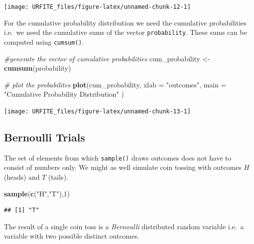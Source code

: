 \documentclass[]{book}
\newenvironment{Shaded}{\begin{snugshade}}{\end{snugshade}}
\newcommand{\KeywordTok}[1]{\textcolor[rgb]{0.13,0.29,0.53}{\textbf{#1}}}
\newcommand{\DataTypeTok}[1]{\textcolor[rgb]{0.13,0.29,0.53}{#1}}
\newcommand{\DecValTok}[1]{\textcolor[rgb]{0.00,0.00,0.81}{#1}}
\newcommand{\StringTok}[1]{\textcolor[rgb]{0.31,0.60,0.02}{#1}}
\newcommand{\CommentTok}[1]{\textcolor[rgb]{0.56,0.35,0.01}{\textit{#1}}}
\newcommand{\NormalTok}[1]{#1}
\theoremstyle{definition}
\theoremstyle{definition}
\theoremstyle{definition}
\theoremstyle{remark}
\begin{document}
\begin{center}\texttt{[image: URFITE\_files/figure-latex/unnamed-chunk-12-1]} \end{center}

For the cumulative probability distribution we need the cumulative
probabilities i.e.~we need the cumulative sums of the vector
\texttt{probability}. These sums can be computed using
\texttt{cumsum()}.

\begin{Shaded}
\begin{Highlighting}[]
\CommentTok{#generate the vector of cumulative probabilities }
\NormalTok{cum_probability <-}\StringTok{ }\KeywordTok{cumsum}\NormalTok{(probability) }

\CommentTok{# plot the probabilites }
\KeywordTok{plot}\NormalTok{(cum_probability, }
     \DataTypeTok{xlab =} \StringTok{"outcomes"}\NormalTok{, }
     \DataTypeTok{main =} \StringTok{"Cumulative Probability Distribution"}
\NormalTok{     ) }
\end{Highlighting}
\end{Shaded}

\begin{center}\texttt{[image: URFITE\_files/figure-latex/unnamed-chunk-13-1]} \end{center}

\subsection*{Bernoulli Trials}\label{bernoulli-trials}

The set of elements from which \texttt{sample()} draws outcomes does not
have to consist of numbers only. We might as well simulate coin tossing
with outcomes \(H\) (heads) and \(T\) (tails).

\begin{Shaded}
\begin{Highlighting}[]
\KeywordTok{sample}\NormalTok{(}\KeywordTok{c}\NormalTok{(}\StringTok{"H"}\NormalTok{,}\StringTok{"T"}\NormalTok{),}\DecValTok{1}\NormalTok{) }
\end{Highlighting}
\end{Shaded}

\begin{verbatim}
## [1] "T"
\end{verbatim}

The result of a single coin toss is a \emph{Bernoulli} distributed
random variable i.e.~a variable with two possible distinct outcomes.
\end{document}
